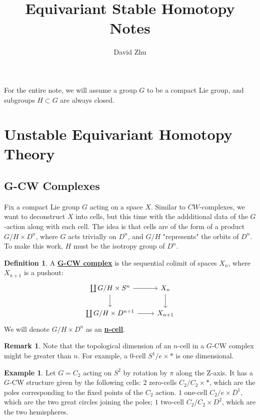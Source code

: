 \documentclass{article}
\title{Equivariant Stable Homotopy Notes}
\author{David Zhu}
\theoremstyle{definition}
\theoremstyle{definition}
\newtheorem{definition}{Definition}[theorem]
\theoremstyle{definition}
\newtheorem{remark}{Remark}[theorem]
\theoremstyle{definition}
\theoremstyle{definition}
\theoremstyle{definition}
\theoremstyle{definition}
\newtheorem{example}{Example}[theorem]
\begin{document}
\maketitle
For the entire note, we will assume a group $G$ to be a compact Lie group, and subgroups $H\subset G$ are always closed. 

\section{Unstable Equivariant Homotopy Theory}
\subsection{G-CW Complexes}
Fix a compact Lie group $G$ acting on a space $X$. Similar to $CW$-complexes, we want to deconstruct $X$ into cells, but this time with the addditional data of the $G$-action along with each cell. The idea is that cells are of the form of a product $G/H\times D^{n}$, where $G$ acts trivially on $D^n$, and $G/H$ "represents" the orbits of $D^n$. To make this work, $H$ must be the isotropy group of $D^n$. 


\begin{tcolorbox}[colback=purple!5!white,colframe=purple!75!black]
\begin{definition}
A \underline{\textbf{G-CW complex}} is the sequential colimit of spaces $X_n$, where $X_{n+1}$ is a pushout: 
\[\begin{tikzcd}
\coprod G/H\times S^n\arrow[r]\arrow[d]&X_n\arrow[d]\\
\coprod G/H\times D^{n+1}\arrow[r]&X_{n+1}
\end{tikzcd}\]
We will denote  $G/H\times D^{n}$ as an \underline{\textbf{n-cell}}. 
\end{definition}
\end{tcolorbox}

\begin{tcolorbox}[colback=green!5!white,colframe=green!30!white]
\begin{remark}
Note that the topological dimension of an $n$-cell in a $G$-CW complex might be greater than $n$. For example, a $0$-cell $S^1/e\times *$ is one dimensional. 
\end{remark}
\end{tcolorbox}

\begin{tcolorbox}[colback=yellow!5!white,colframe=yellow!30!white]
\begin{example}
Let $G=C_2$ acting on $S^2$ by rotation by $\pi$ along the Z-axis. It has a $G$-CW structure given by the following cells: $2$ zero-cells $C_2/C_2\times *$, which are the poles corresponding to the fixed points of the $C_2$ action. $1$ one-cell $C_2/e\times D^1$, which are the two great circles joining the poles; $1$ two-cell $C_2/C_2\times D^2$, which are the two hemispheres.  
\end{example}
\end{tcolorbox}
\end{document}
